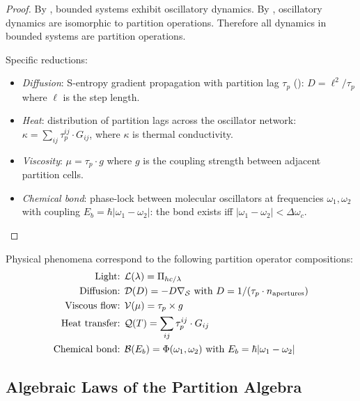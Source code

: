 \begin{proof}
By , bounded systems exhibit oscillatory dynamics.
By , oscillatory dynamics are isomorphic to partition
operations.  Therefore all dynamics in bounded systems are partition operations.

Specific reductions:
\begin{itemize}[noitemsep]
    \item \emph{Diffusion}: S-entropy gradient propagation with partition lag
          $\tau_p$ ():
          $D = \ell^2 / \tau_p$ where $\ell$ is the step length.
    \item \emph{Heat}: distribution of partition lags across the oscillator
          network: $\kappa = \sum_{ij} \tau_p^{ij} \cdot G_{ij}$,
          where $\kappa$ is thermal conductivity.
    \item \emph{Viscosity}: $\mu = \tau_p \cdot g$ where $g$ is the
          coupling strength between adjacent partition cells.
    \item \emph{Chemical bond}: phase-lock between molecular oscillators at
          frequencies $\omega_1, \omega_2$ with coupling $E_b = \hbar|\omega_1 -
          \omega_2|$: the bond exists iff $|\omega_1 - \omega_2| < \Delta\omega_c$.
\end{itemize}
\end{proof}

\begin{definition}
\label{def:physical-ops}
Physical phenomena correspond to the following partition operator
compositions:
\begin{align*}
    \text{Light: } & \mathcal{L}(\lambda) = \Pi_{hc/\lambda} \\
    \text{Diffusion: } & \mathcal{D}(D) = -D\nabla_{\mathcal{S}}
              \text{ with } D = 1/(\tau_p \cdot n_\mathrm{apertures}) \\
    \text{Viscous flow: } & \mathcal{V}(\mu) = \tau_p \times g \\
    \text{Heat transfer: } & \mathcal{Q}(T) = \sum_{ij} \tau_p^{ij} \cdot G_{ij} \\
    \text{Chemical bond: } & \mathcal{B}(E_b) = \Phi(\omega_1, \omega_2)
              \text{ with } E_b = \hbar|\omega_1 - \omega_2|
\end{align*}
\end{definition}

\subsection{Algebraic Laws of the Partition Algebra}

